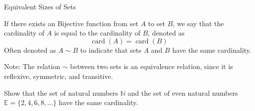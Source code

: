 \documentclass[12pt, a4paper]{article}
\DeclareMathOperator{\card}{card}
\begin{document}




\clearpage

\begin{heading}
	Equivalent Sizes of Sets
\end{heading}

\vspace{10pt}

\begin{definition}
	If there exists an Bijective function from set \(A\) to set \(B\), we say that the cardinality of \(A\) is equal to the cardinality of \(B\), denoted as \[\card(A) = \card(B)\]
	Often denoted as \(A \sim B\) to indicate that sets \(A\) and \(B\) have the same cardinality.
\end{definition}

\vfill

\begin{tcolorbox}[colback=ProbBack, colframe=ProbMain]
	Note: The relation $\sim$ between two sets is an equivalence relation, since it is reflexive, symmetric, and transitive.
\end{tcolorbox}

\clearpage

\begin{problem}
	Show that the set of natural numbers \(\mathbb{N}\) and the set of even natural numbers \(\mathbb{E} = \{2, 4, 6, 8, \ldots\}\) have the same cardinality.
\end{problem}
\end{document}
